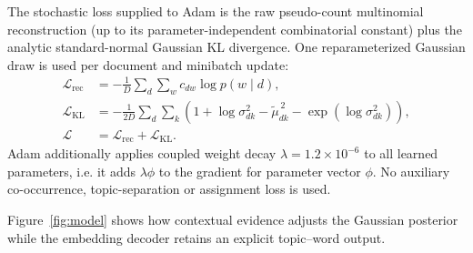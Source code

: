 \documentclass[10pt,a4paper]{article}
\begin{document}
The stochastic loss supplied to Adam is the raw pseudo-count multinomial
reconstruction (up to its parameter-independent combinatorial constant) plus
the analytic standard-normal Gaussian KL divergence. One reparameterized Gaussian draw is
used per document and minibatch update:
\begin{align}
  \mathcal L_{\mathrm{rec}}
  &=-\frac1D\sum_d\sum_w c_{dw}\log p(w\mid d),
  \label{eq:reconstruction}\\
  \mathcal L_{\mathrm{KL}}
  &=-\frac{1}{2D}\sum_d\sum_k
  \left(1+\log\sigma_{dk}^2-\widetilde\mu_{dk}^{\,2}
  -\exp(\log\sigma_{dk}^2)\right),
  \label{eq:kl}\\
  \mathcal L&=\mathcal L_{\mathrm{rec}}+\mathcal L_{\mathrm{KL}}.
  \label{eq:objective}
\end{align}
Adam additionally applies coupled weight decay $\lambda=1.2\times10^{-6}$ to
all learned parameters, i.e. it adds $\lambda\phi$ to the gradient for parameter
vector $\phi$. No auxiliary co-occurrence, topic-separation or assignment loss
is used.

Figure~\ref{fig:model} shows how contextual evidence adjusts the Gaussian
posterior while the embedding decoder retains an explicit topic--word output.
\end{document}
